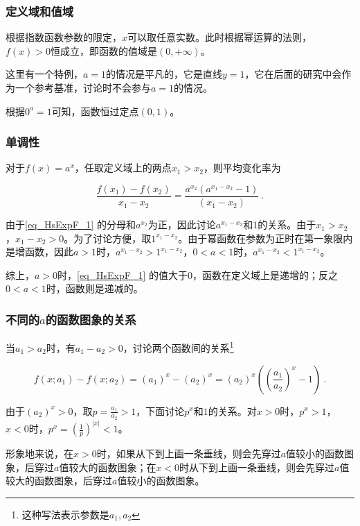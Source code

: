 \subsubsection{定义域和值域}

根据指数函数参数的限定，$x$可以取任意实数。此时根据幂运算的法则，$f(x)>0$恒成立，即函数的值域是$(0,+\infty)$。

这里有一个特例，$a=1$的情况是平凡的，它是直线$y=1$，它在后面的研究中会作为一个参考基准，讨论时不会参与$a=1$的情况。

根据$0^a=1$可知，函数恒过定点$(0,1)$。

\subsubsection{单调性}

对于$f(x)=a^x$，任取定义域上的两点$x_1>x_2$，则平均变化率为

\begin{equation}\label{eq_HsExpF_1}
\frac{f(x_1)-f(x_2)}{x_1-x_2}=\frac{a^{x_2}(a^{x_1-x_2}-1)}{(x_1-x_2)}~.
\end{equation}

由于\autoref{eq_HsExpF_1} 的分母和$a^{x_2}$为正，因此讨论$a^{x_1-x_2}$和$1$的关系。由于$x_1>x_2$，$x_1-x_2>0$。为了讨论方便，取$1^{x_1-x_2}$。由于幂函数在参数为正时在第一象限内是增函数，因此$a>1$时，$a^{x_1-x_2}>1^{x_1-x_2}$，$0<a<1$时，$a^{x_1-x_2}<1^{x_1-x_2}$。

综上，$a>0$时，\autoref{eq_HsExpF_1} 的值大于$0$，函数在定义域上是递增的；反之$0<a<1$时，函数则是递减的。

\subsubsection{不同的$a$的函数图象的关系}

当$a_1>a_2$时，有$a_1-a_2>0$，讨论两个函数间的关系\footnote{这种写法表示参数是$a_1,a_2$}

\begin{equation}
f(x;a_1)-f(x;a_2)=(a_1)^x-(a_2)^x=(a_2)^x\left(\left(\frac{a_1}{a_2}\right)^x-1\right)~.
\end{equation}

由于$\displaystyle (a_2)^x>0$，取$p=\frac{a_1}{a_2}>1$，下面讨论$p^x$和$1$的关系。对$x>0$时，$p^x>1$，$x<0$时，$\displaystyle p^x=\left(\frac{1}{p}\right)^{|x|}<1$。

形象地来说，在$x>0$时，如果从下到上画一条垂线，则会先穿过$a$值较小的函数图象，后穿过$a$值较大的函数图象；在$x<0$时从下到上画一条垂线，则会先穿过$a$值较大的函数图象，后穿过$a$值较小的函数图象。

